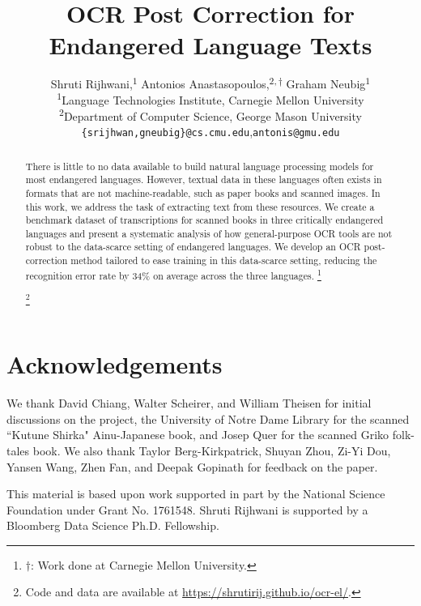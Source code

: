 \documentclass[11pt,a4paper]{article}
\title{OCR Post Correction for Endangered Language Texts}
\author{Shruti Rijhwani,\textsuperscript{$1$} Antonios Anastasopoulos,\textsuperscript{$2,\dagger$} Graham Neubig\textsuperscript{$1$}  \\
  \textsuperscript{$1$}Language Technologies Institute, Carnegie Mellon University\\
  \textsuperscript{$2$}Department of Computer Science, George Mason University\\
  \texttt{\{srijhwan,gneubig\}@cs.cmu.edu},\quad\texttt{antonis@gmu.edu}}
\date{}
\newcommand\blfootnote[1]{%
  \begingroup
  \renewcommand\thefootnote{}\footnote{\noindent #1}%
  \addtocounter{footnote}{-1}%
  \endgroup
}
\begin{document}
\maketitle
\begin{abstract}
There is little to no data available to build natural language processing models for most endangered languages. However, textual data in these languages often exists in formats that are not machine-readable, such as paper books and scanned images. In this work, we address the task of extracting text from these resources. We create a benchmark dataset of transcriptions for scanned books in three critically endangered languages and present a systematic analysis of how general-purpose OCR tools are not robust to the data-scarce setting of endangered languages. We develop an OCR post-correction method tailored to ease training in this data-scarce setting, reducing the recognition error rate by 34\% on average across the three languages.\blfootnote{$\dagger$: Work done at Carnegie Mellon University.}\footnote{Code and data are available at \url{https://shrutirij.github.io/ocr-el/}.}
\end{abstract}










\section*{Acknowledgements}
We thank David Chiang, Walter Scheirer, and William Theisen for initial discussions on the project, the University of Notre Dame Library for the scanned ``Kutune Shirka" Ainu-Japanese book, and Josep Quer for the scanned Griko folk-tales book. We also thank Taylor Berg-Kirkpatrick, Shuyan Zhou, Zi-Yi Dou, Yansen Wang, Zhen Fan, and Deepak Gopinath for feedback on the paper.

This material is based upon work supported in part by the National Science Foundation under Grant No. 1761548. Shruti Rijhwani is supported by a Bloomberg Data Science Ph.D. Fellowship.





\newpage

\end{document}
